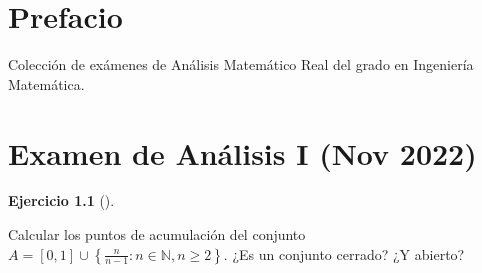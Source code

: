 \documentclass[
  a4paper,
]{scrreport}
\theoremstyle{definition}
\newtheorem{exercise}{Ejercicio}[chapter]
\theoremstyle{remark}
\begin{document}
\hypertarget{prefacio}{%
\chapter*{Prefacio}\label{prefacio}}


Colección de exámenes de Análisis Matemático Real del grado en
Ingeniería Matemática.


\hypertarget{examen-de-anuxe1lisis-i-nov-2022}{%
\chapter{Examen de Análisis I (Nov
2022)}\label{examen-de-anuxe1lisis-i-nov-2022}}

\leavevmode{}%
\begin{exercise}[]\label{exr-1}

Calcular los puntos de acumulación del conjunto
\(A=[0,1]\cup \left\{\frac{n}{n-1}: n\in\mathbb{N}, n\geq 2\right\}\).
¿Es un conjunto cerrado? ¿Y abierto?

\end{exercise}
\end{document}
